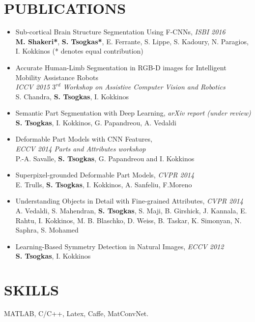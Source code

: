 \documentclass[margin]{res}
\begin{document}
\begin{resume}
\section{PUBLICATIONS} 
	\begin{itemize}
	\item  Sub-cortical Brain Structure Segmentation Using F-CNNs, \emph{ISBI 2016}\\
		  \textbf{M. Shakeri*}, \textbf{S. Tsogkas*}, E. Ferrante, S. Lippe, S. Kadoury, N. Paragios, I. Kokkinos (* denotes equal contribution)   
	\item   Accurate Human-Limb Segmentation in RGB-D images for Intelligent Mobility Assistance Robots\\
		   \emph{ICCV 2015 $3^{rd}$ Workshop on Assistive Computer Vision and Robotics}\\
		  S. Chandra, \textbf{S. Tsogkas}, I. Kokkinos
	\item   Semantic Part Segmentation with Deep Learning, \emph{arXiv report (under review)}\\
		  \textbf{S. Tsogkas}, I. Kokkinos, G. Papandreou, A. Vedaldi 
	\item  Deformable Part Models with CNN Features,\\ \emph{ECCV 2014 Parts and Attributes workshop}\\
	  P.-A. Savalle, \textbf{S. Tsogkas}, G. Papandreou and I. Kokkinos 
	\item  Superpixel-grounded Deformable Part Models, \emph{CVPR 2014}\\
		  E. Trulls, \textbf{S. Tsogkas}, I. Kokkinos, A. Sanfeliu, F.Moreno
	\item Understanding Objects in Detail with Fine-grained Attributes, \emph{CVPR 2014} \\
	A. Vedaldi, S. Mahendran, \textbf{S. Tsogkas}, S. Maji, B. Girshick, J. Kannala, E. Rahtu, I. Kokkinos, M. B. Blaschko, D. Weiss, B. Taskar, K. Simonyan, N. Saphra, S. Mohamed 
	\item Learning-Based Symmetry Detection in Natural Images, \emph{ECCV 2012} \\
		  \textbf{S. Tsogkas}, I. Kokkinos
	\end{itemize}

\section{SKILLS} MATLAB, C/C++, Latex, Caffe, MatConvNet. 
\newline


\end{resume}
\end{document}
